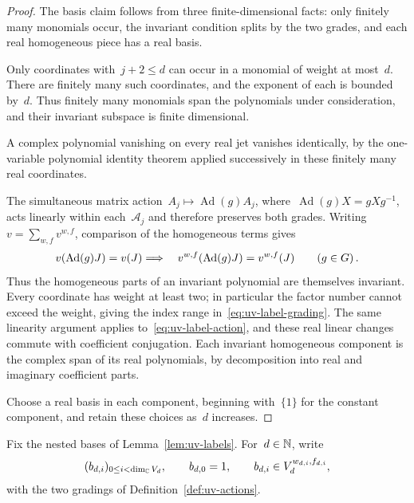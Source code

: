 \begin{proof}
The basis claim follows from three finite-dimensional facts: only finitely many monomials occur, the invariant condition splits by the two grades, and each real homogeneous piece has a real basis.


Only coordinates with~$j+2\le d$ can occur in a monomial of weight at most~$d$.
There are finitely many such coordinates, and the exponent of each is bounded by~$d$.
Thus finitely many monomials span the polynomials under consideration, and their invariant subspace is finite dimensional.

A complex polynomial vanishing on every real jet vanishes identically, by the one-variable polynomial identity theorem applied successively in these finitely many real coordinates.

The simultaneous matrix action~$A_j\mapsto\operatorname{Ad}(g)A_j$, where~$\operatorname{Ad}(g)X=gXg^{-1}$, acts linearly within each~$\mathcal A_j$ and therefore preserves both grades.
Writing~$v=\sum_{w,f}v^{w,f}$, comparison of the homogeneous terms gives
\begin{equation}\label{eq:uv-homogeneous-invariance}
 v(\operatorname{Ad}(g)J)=v(J) \Longrightarrow\quad
 v^{w,f}(\operatorname{Ad}(g)J)=v^{w,f}(J)\qquad(g\in G)\,.
\end{equation}
Thus the homogeneous parts of an invariant polynomial are themselves invariant.
Every coordinate has weight at least two; in particular the factor number cannot exceed the weight, giving the index range in~\eqref{eq:uv-label-grading}.
The same linearity argument applies to~\eqref{eq:uv-label-action}, and these real linear changes commute with coefficient conjugation.
Each invariant homogeneous component is the complex span of its real polynomials, by decomposition into real and imaginary coefficient parts.

Choose a real basis in each component, beginning with~$\{1\}$ for the constant component, and retain these choices as~$d$ increases.
\end{proof}

\begin{definition}\label{def:uv-bases}
Fix the nested bases of Lemma~\ref{lem:uv-labels}.
For~$d\in\mathbb N$, write
\begin{equation*}
 (b_{d,i})_{0\le i<\dim_\mathbb C V_d},\qquad
 b_{d,0}=1,\qquad b_{d,i}\in V_d^{w_{d,i},f_{d,i}},
\end{equation*}
with the two gradings of Definition~\ref{def:uv-actions}.
\end{definition}

